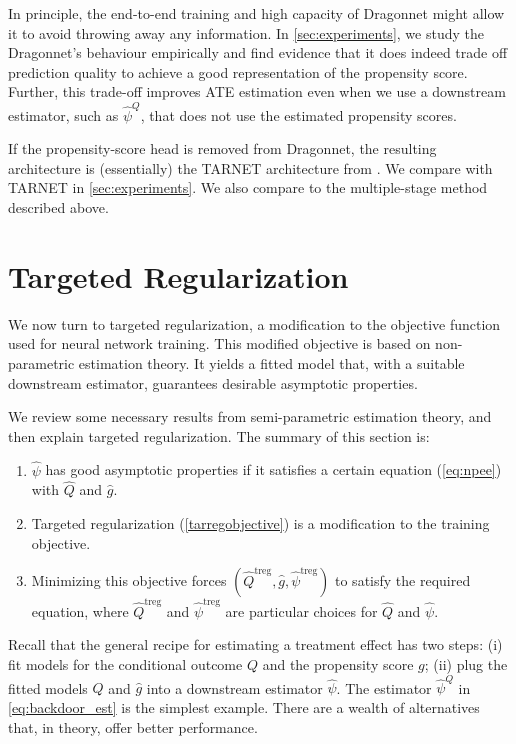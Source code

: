 \documentclass{article}
\begin{document}
In principle, the end-to-end training and high capacity of Dragonnet might allow it to avoid throwing away
any information. 
In \cref{sec:experiments}, we study the Dragonnet's behaviour empirically and find evidence that it does indeed
trade off prediction quality to achieve a good representation of the propensity score. 
Further, this trade-off improves ATE estimation even when we use a downstream estimator, such as $\hat{\psi}^{Q}$,
that does not use the estimated propensity scores.

If the propensity-score head is removed from Dragonnet, the resulting architecture is
(essentially) the TARNET architecture from \citet{shalit2016estimating}.
We compare with TARNET in \cref{sec:experiments}.
We also compare to the multiple-stage method described above.


\section{Targeted Regularization}
\label{sec:tarreg}
We now turn to targeted regularization, a modification to the objective function used for neural network training.
This modified objective is based on non-parametric estimation theory.
It yields a fitted model that, with a suitable downstream estimator, guarantees desirable asymptotic properties.

We review some necessary results from semi-parametric estimation theory, and then explain targeted regularization.
The summary of this section is:
\begin{enumerate}[nosep]
    \item $\hat{\psi}$ has good asymptotic properties if it satisfies a certain equation (\cref{eq:npee}) with $\hat{Q}$ and $\hat{g}$.
    \item Targeted regularization (\cref{tarregobjective}) is a modification to the training objective.%
    \item Minimizing this objective forces $(\hat{Q}^{\mathrm{treg}},\hat{g},\hat{\psi}^{\mathrm{treg}})$ to satisfy the required equation,
      where $\hat{Q}^{\mathrm{treg}}$ and $\hat{\psi}^{\mathrm{treg}}$ are particular choices for $\hat{Q}$ and $\hat{\psi}$.
\end{enumerate}

Recall that the general recipe for estimating a treatment effect has two steps: (i) fit models for the conditional outcome $Q$ and the propensity score $g$; (ii) plug the fitted models $\hat{Q}$ and $\hat{g}$ into a downstream estimator $\hat{\psi}$.
The estimator $\hat{\psi}^{Q}$ in \cref{eq:backdoor_est} is the simplest example.
There are a wealth of alternatives that, in theory, offer better performance.
\end{document}
